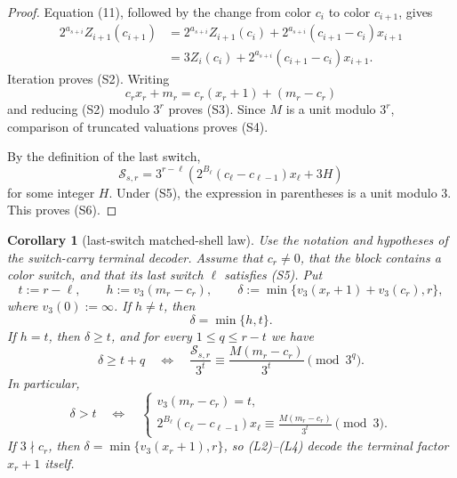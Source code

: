 \documentclass[11pt]{article}
\newtheorem{corollary}[theorem]{Corollary}
\begin{document}
\begin{proof}
Equation (11), followed by the change from color $c_i$ to color $c_{i+1}$,
gives
\[
\begin{aligned}
  2^{a_{s+i}}Z_{i+1}(c_{i+1})
  &=2^{a_{s+i}}Z_{i+1}(c_i)
    +2^{a_{s+i}}(c_{i+1}-c_i)x_{i+1}\\
  &=3Z_i(c_i)
    +2^{a_{s+i}}(c_{i+1}-c_i)x_{i+1}.
\end{aligned}
\]
Iteration proves (S2).  Writing
\[
  c_rx_r+m_r=c_r(x_r+1)+(m_r-c_r)
\]
and reducing (S2) modulo $3^r$ proves (S3).  Since $M$ is a unit modulo
$3^r$, comparison of truncated valuations proves (S4).

By the definition of the last switch,
\[
  \mathscr S_{s,r}
  =3^{r-\ell}
  \left(
    2^{B_\ell}(c_\ell-c_{\ell-1})x_\ell+3H
  \right)
\]
for some integer $H$.  Under (S5), the expression in parentheses is a
unit modulo $3$.  This proves (S6).
\end{proof}

\begin{corollary}[last-switch matched-shell law]
Use the notation and hypotheses of the switch-carry terminal decoder.  Assume
that $c_r\neq0$, that the block contains a color switch, and that its last
switch $\ell$ satisfies (S5).  Put
\[
  t:=r-\ell,
  \qquad
  h:=v_3(m_r-c_r),
  \qquad
  \delta:=\min\{v_3(x_r+1)+v_3(c_r),r\},
  \tag{L1}
\]
where $v_3(0):=\infty$.  If $h\neq t$, then
\[
\boxed{\delta=\min\{h,t\}.}
\tag{L2}
\]
If $h=t$, then $\delta\geq t$, and for every $1\leq q\leq r-t$ we have
\[
\boxed{
  \delta\geq t+q
  \quad\Longleftrightarrow\quad
  \frac{\mathscr S_{s,r}}{3^t}
  \equiv
  \frac{M(m_r-c_r)}{3^t}
  \pmod {3^q}.}
\tag{L3}
\]
In particular,
\[
\boxed{
  \delta>t
  \quad\Longleftrightarrow\quad
  \begin{cases}
    v_3(m_r-c_r)=t,\\[2mm]
    2^{B_\ell}(c_\ell-c_{\ell-1})x_\ell
    \equiv
    \displaystyle\frac{M(m_r-c_r)}{3^t}\pmod 3.
  \end{cases}}
\tag{L4}
\]
If $3\nmid c_r$, then $\delta=\min\{v_3(x_r+1),r\}$, so (L2)--(L4)
decode the terminal factor $x_r+1$ itself.
\end{corollary}
\end{document}

